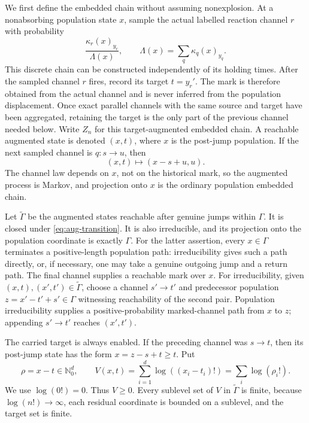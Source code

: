 We first define the embedded chain without assuming nonexplosion.  At a
nonabsorbing population state \(x\), sample the actual labelled reaction
channel \(r\) with probability
\begin{equation}\label{eq:channel-kernel}
  \frac{\kappa_r(x)_{y_r}}{\Lambda(x)},
  \qquad
  \Lambda(x)=\sum_q\kappa_q(x)_{y_q}.
\end{equation}
This discrete chain can be constructed independently of its holding times.
After the sampled channel \(r\) fires, record its target \(t=y_r'\).  The mark
is therefore obtained from the actual channel and is never inferred from the
population displacement.  Once exact parallel channels with the same source
and target have been aggregated, retaining the target is the only part of the
previous channel needed below.  Write \(Z_n\) for this target-augmented
embedded chain.  A reachable augmented state is denoted \((x,t)\), where
\(x\) is the post-jump population.  If the next sampled
channel is \(q:s\to u\), then
\begin{equation}\label{eq:aug-transition}
  (x,t)\longmapsto(x-s+u,u).
\end{equation}
The channel law depends on \(x\), not on the historical mark, so the augmented
process is Markov, and projection onto \(x\) is the ordinary population
embedded chain.

Let \(\widetilde\Gamma\) be the augmented states reachable after genuine
jumps within \(\Gamma\).  It is closed under \eqref{eq:aug-transition}.  It is
also irreducible, and its projection onto the population coordinate is exactly
\(\Gamma\).  For the latter assertion, every \(x\in\Gamma\) terminates a
positive-length population path: irreducibility gives such a path directly,
or, if necessary, one may take a genuine outgoing jump and a return path.
The final channel supplies a reachable mark over \(x\).  For irreducibility,
given \((x,t),(x',t')\in\widetilde\Gamma\), choose
a channel \(s'\to t'\) and predecessor population
\(z=x'-t'+s'\in\Gamma\) witnessing reachability of the second pair.
Population irreducibility supplies a positive-probability marked-channel path
from \(x\) to \(z\); appending \(s'\to t'\) reaches \((x',t')\).

The carried target is always enabled.  If the preceding channel was
\(s\to t\), then its post-jump state has the form \(x=z-s+t\ge t\).  Put
\begin{equation}\label{eq:residual}
  \rho=x-t\in\mathbb N_0^d,
  \qquad
  V(x,t)=\sum_{i=1}^d\log((x_i-t_i)!)=\sum_i\log(\rho_i!).
\end{equation}
We use \(\log(0!)=0\).  Thus \(V\ge0\).  Every sublevel set of \(V\) in
\(\widetilde\Gamma\) is finite, because \(\log(n!)\to\infty\), each residual
coordinate is bounded on a sublevel, and the target set is finite.

